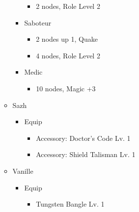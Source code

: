 \documentclass{report}
\begin{document}
\begin{menu}
\begin{itemize}
\begin{itemize}
\begin{itemize}
\begin{itemize}
                \item 2 nodes, Role Level 2
            \end{itemize}
            \item Saboteur
            \begin{itemize}
                \item 2 nodes up 1, Quake
                \item 4 nodes, Role Level 2
            \end{itemize}
            \item Medic
            \begin{itemize}
                \item 10 nodes, Magic +3
            \end{itemize}
        \end{itemize}
    \end{itemize}
    \equip
    \begin{itemize}
        \item Sazh
        \begin{itemize}
            \item Equip
            \begin{itemize}
                \item Accessory: Doctor's Code Lv. 1
                \item Accessory: Shield Talisman Lv. 1
            \end{itemize}
        \end{itemize}
        \item Vanille
        \begin{itemize}
            \item Equip
            \begin{itemize}
                \item Tungsten Bangle Lv. 1
            \end{itemize}
        \end{itemize}
    \end{itemize}
\end{itemize}
\end{menu}
\renewcommand{\first}{[1] Slash \& Burn (\com/\rav)}
\renewcommand{\second}{[2] War \& Peace (\com/\med)}
\renewcommand{\third}{[3] Tide Turner (\syn/\sab)}
\renewcommand{\fourth}{[4] }
\renewcommand{\fifth}{[5] Undermine (\rav/\sab)}
\renewcommand{\sixth}{[6] Divide \& Conquer (\com/\sab)}
\end{document}
